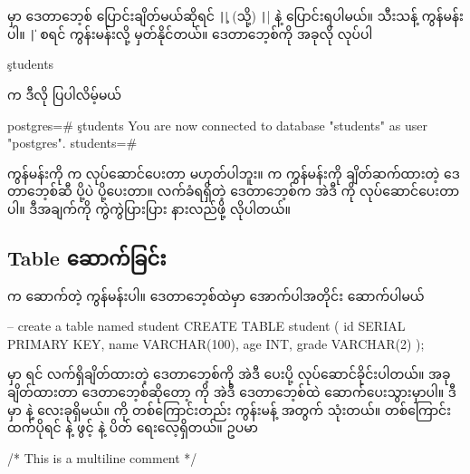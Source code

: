 \begin{figure}[tb!]
\caption{}
\label{fig:listdb}
\end{figure}

 မှာ ဒေတာဘေ့စ် ပြောင်းချိတ်မယ်ဆိုရင် \texttt|\c| (သို့) \texttt|\connect| နဲ့ ပြောင်းရပါမယ်။  သီးသန့် ကွန်မန်းပါ။ \texttt|\|\fEn{)} စရင်  ကွန်းမန်းလို့ မှတ်နိုင်တယ်။  ဒေတာဘေ့စ်ကို အခုလို  လုပ်ပါ
\begin{codetxt}
\c students
\end{codetxt}
 က ဒီလို ပြပါလိမ့်မယ်
\begin{codetxt}
postgres=# \c students
You are now connected to database "students" as user "postgres".
students=#
\end{codetxt}

\begin{mytcbox}
 ကွန်မန်းကို  က လုပ်ဆောင်ပေးတာ မဟုတ်ပါဘူး။  က  ကွန်မန်းကို ချိတ်ဆက်ထားတဲ့ ဒေတာဘေ့စ်ဆီ ပို့ပဲ ပို့ပေးတာ။ လက်ခံရရှိတဲ့ ဒေတာဘေ့စ်က အဲဒီ  ကို လုပ်ဆောင်ပေးတာပါ။ ဒီအချက်ကို ကွဲကွဲပြားပြား နားလည်ဖို့ လိုပါတယ်။
\end{mytcbox}

\subsection*{Table ဆောက်ခြင်း}
 က  ဆောက်တဲ့  ကွန်မန်းပါ။  ဒေတာဘေ့စ်ထဲမှာ  အောက်ပါအတိုင်း ဆောက်ပါမယ်
%
\begin{sql}
-- create a table named student 
CREATE TABLE student (
    id SERIAL PRIMARY KEY,
    name VARCHAR(100),
    age INT,
    grade VARCHAR(2)
);
\end{sql}
%  
 မှာ   ရင် လက်ရှိချိတ်ထားတဲ့ ဒေတာဘေ့စ်ကို အဲဒီ  ပေးပို့ လုပ်ဆောင်ခိုင်းပါတယ်။ အခုချိတ်ထားတာ  ဒေတာဘေ့စ်ဆိုတော့  ကို အဲဒီ ဒေတာဘေ့စ်ထဲ ဆောက်ပေးသွားမှာပါ။ ဒီ  မှာ \fEn{,} \fEn{,}  နဲ့   လေးခုရှိမယ်။ \fCode{--} ကို တစ်ကြောင်းတည်း ကွန်းမန့် အတွက် သုံးတယ်။ တစ်ကြောင်းထက်ပိုရင် \fCode{/*} နဲ့ ဖွင့် \fCode{*/} နဲ့ ပိတ် ရေးလေ့ရှိတယ်။ ဥပမာ
%
\begin{sql}
/* This is a
   multiline comment */
\end{sql}
%

